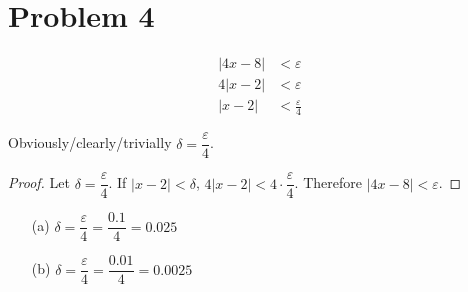 \documentclass{article}
\newcommand*{\problem}[1]{\section*{Problem #1}}
\newcommand*{\eps}{\varepsilon}
\begin{document}
\problem{4}
\begin{align*}
	|4x-8|&<\eps \\
	4|x-2|&<\eps \\
	|x-2|&<\frac{\eps}{4}
\end{align*}

Obviously/clearly/trivially $\delta=\dfrac{\eps}{4}$.

\begin{proof}
	Let $\delta=\dfrac{\eps}{4}$. If $|x-2|<\delta$, $4|x-2|<4\cdot\dfrac{\eps}{4}$. Therefore $|4x-8|<\eps$.
\end{proof}

\begin{itemize}
	\item[(a)]
	$\delta=\dfrac{\eps}{4}=\dfrac{0.1}{4}=\boxed{0.025}$

	\item[(b)]
	$\delta=\dfrac{\eps}{4}=\dfrac{0.01}{4}=\boxed{0.0025}$
\end{itemize}
\end{document}
